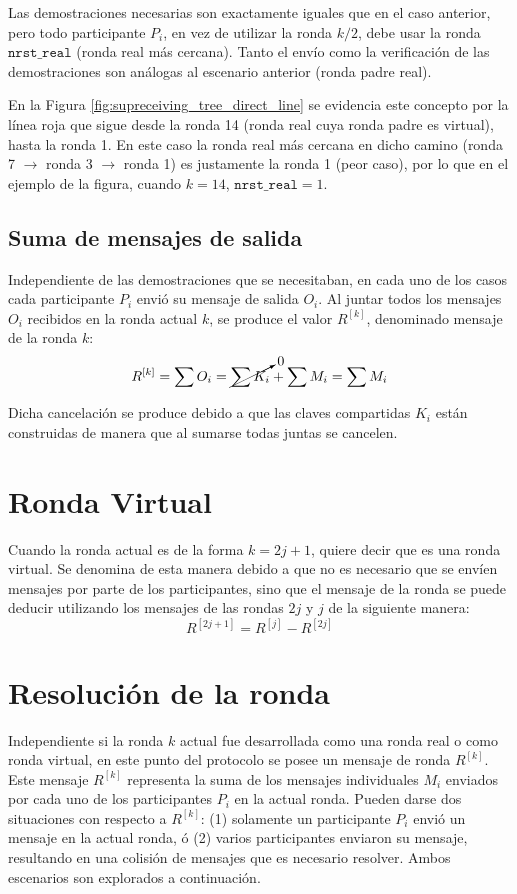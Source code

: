 Las demostraciones necesarias son exactamente iguales que en el caso anterior, 
pero todo participante $P_i$, en vez de utilizar la ronda $k/2$, debe usar la 
ronda $\mathtt{nrst\_real}$ (ronda real más cercana). Tanto el envío como la 
verificación de las demostraciones son análogas al escenario anterior (ronda 
padre real).

En la Figura \ref{fig:supreceiving_tree_direct_line} 
se evidencia este concepto por la línea roja que sigue desde la ronda 14 
(ronda real cuya ronda padre es virtual), hasta la ronda 1. En este caso la 
ronda real más cercana en dicho camino (ronda 7 $\to$ ronda 3 $\to$ ronda 1) 
es justamente la ronda 1 (peor caso), por lo que en el ejemplo de la figura, 
cuando $k = 14$, $\mathtt{nrst\_real} = 1$. 

\subsection{Suma de mensajes de salida}

Independiente de las demostraciones que se necesitaban, en cada uno de los 
casos cada participante $P_i$ envió su mensaje de salida $O_i$. Al juntar 
todos los mensajes $O_i$ recibidos en la ronda actual $k$, se produce el valor 
$R^{[k]}$, denominado mensaje de la ronda 
$k$: $$R^{[k]} = \sum O_i = \cancelto{0}{\sum K_i} + \sum M_i = \sum M_i$$

Dicha cancelación se produce debido a que las claves compartidas $K_i$ están 
construidas de manera que al sumarse todas juntas se cancelen.

\section{Ronda Virtual}

Cuando la ronda actual es de la forma $k = 2j + 1$, quiere decir que es una 
ronda virtual. Se denomina de esta manera debido a que no es necesario que se 
envíen mensajes por parte de los participantes, sino que el mensaje de la 
ronda se puede deducir utilizando los mensajes de las rondas $2j$ y $j$ de la 
siguiente manera: 
$$R^{[2j + 1]} = R^{[j]} - R^{[2j]}$$

\section{Resolución de la ronda}

Independiente si la ronda $k$ actual fue desarrollada como una ronda real o 
como ronda virtual, en este punto del protocolo se posee un mensaje de ronda 
$R^{[k]}$. Este mensaje $R^{[k]}$ representa la suma de los mensajes 
individuales $M_i$ enviados por cada uno de los participantes $P_i$ en la 
actual ronda. Pueden darse dos situaciones con respecto a $R^{[k]}$: (1) 
solamente un participante $P_i$ envió un mensaje en la actual ronda, ó (2) 
varios participantes enviaron su mensaje, resultando en una colisión de 
mensajes que es necesario resolver. Ambos escenarios son explorados a 
continuación.


